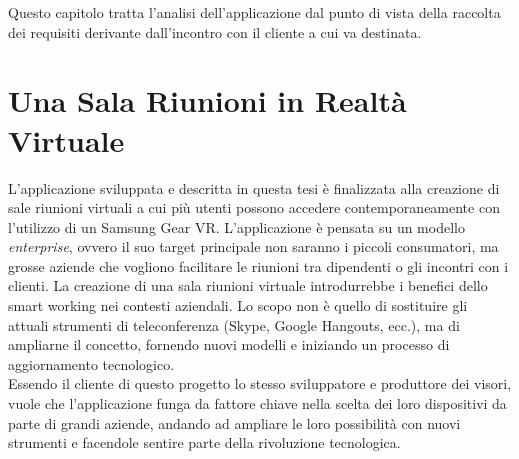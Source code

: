 Questo capitolo tratta l'analisi dell'applicazione dal punto di vista della raccolta dei requisiti derivante dall'incontro con il cliente a cui va destinata. \\

\section{Una Sala Riunioni in Realtà Virtuale}
L'applicazione sviluppata e descritta in questa tesi è finalizzata alla creazione di sale riunioni virtuali a cui più utenti possono accedere contemporaneamente con l'utilizzo di un Samsung Gear VR. L'applicazione è pensata su un modello \textit{enterprise}, ovvero il suo target principale non saranno i piccoli consumatori, ma grosse aziende che vogliono facilitare le riunioni tra dipendenti o gli incontri con i clienti. La creazione di una sala riunioni virtuale introdurrebbe i benefici dello smart working nei contesti aziendali. Lo scopo non è quello di sostituire gli attuali strumenti di teleconferenza (Skype, Google Hangouts, ecc.), ma di ampliarne il concetto, fornendo nuovi modelli e iniziando un processo di aggiornamento tecnologico.\\
Essendo il cliente di questo progetto lo stesso sviluppatore e produttore dei visori, vuole che l'applicazione funga da fattore chiave nella scelta dei loro dispositivi da parte di grandi aziende, andando ad ampliare le loro possibilità con nuovi strumenti e facendole sentire parte della rivoluzione tecnologica. \\

